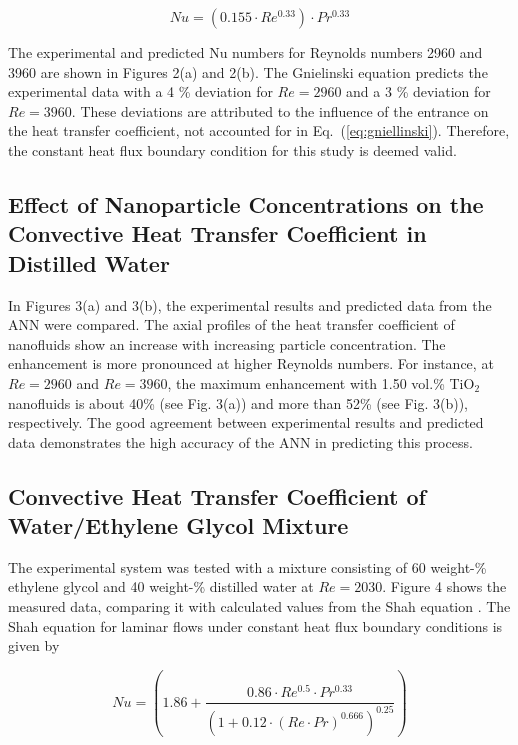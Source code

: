 \documentclass{article}
\begin{document}
\begin{equation}
Nu = \left(0.155 \cdot Re^{0.33}\right) \cdot Pr^{0.33}
\label{eq:gniellinski}
\end{equation}

The experimental and predicted Nu numbers for Reynolds numbers 2960 and 3960 are shown in Figures 2(a) and 2(b). The Gnielinski equation predicts the experimental data with a 4 \% deviation for $Re = 2960$ and a 3 \% deviation for $Re = 3960$. These deviations are attributed to the influence of the entrance on the heat transfer coefficient, not accounted for in Eq.~(\ref{eq:gniellinski}). Therefore, the constant heat flux boundary condition for this study is deemed valid.

\subsection{Effect of Nanoparticle Concentrations on the Convective Heat Transfer Coefficient in Distilled Water}

In Figures 3(a) and 3(b), the experimental results and predicted data from the ANN were compared. The axial profiles of the heat transfer coefficient of nanofluids show an increase with increasing particle concentration. The enhancement is more pronounced at higher Reynolds numbers. For instance, at $Re = 2960$ and $Re = 3960$, the maximum enhancement with 1.50 vol.\% TiO$_2$ nanofluids is about 40\% (see Fig. 3(a)) and more than 52\% (see Fig. 3(b)), respectively. The good agreement between experimental results and predicted data demonstrates the high accuracy of the ANN in predicting this process.

\subsection{Convective Heat Transfer Coefficient of Water/Ethylene Glycol Mixture}

The experimental system was tested with a mixture consisting of 60 weight-\% ethylene glycol and 40 weight-\% distilled water at $Re = 2030$. Figure 4 shows the measured data, comparing it with calculated values from the Shah equation \cite{ref10}. The Shah equation for laminar flows under constant heat flux boundary conditions is given by 

\begin{equation}
Nu = \left(1.86 + \frac{0.86 \cdot Re^{0.5} \cdot Pr^{0.33}}{\left(1 + 0.12 \cdot (Re \cdot Pr)^{0.666}\right)^{0.25}}\right)
\label{eq:shah}
\end{equation}
\end{document}
